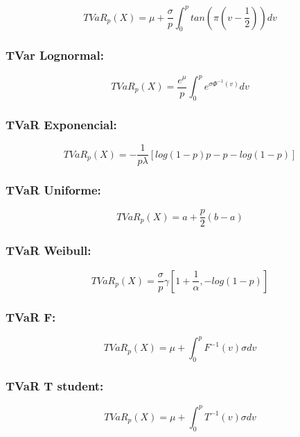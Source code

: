 \documentclass[]{article}
\begin{document}
\[TVaR_p(X)=\mu+\frac{\sigma}{p}\int_{0}^{p}tan\left(\pi\left(v-\frac{1}{2}\right)\right)dv\]

\hypertarget{tvar-lognormal}{%
\subsubsection{\texorpdfstring{\textbf{TVar
Lognormal:}}{TVar Lognormal:}}\label{tvar-lognormal}}

\[TVaR_p(X)=\frac{e^{\mu}}{p}\int_{0}^{p}e^{\sigma\Phi^{-1}(v)}dv\]

\hypertarget{tvar-exponencial}{%
\subsubsection{\texorpdfstring{\textbf{TVaR
Exponencial:}}{TVaR Exponencial:}}\label{tvar-exponencial}}

\[TVaR_p(X) = -\frac{1}{p\lambda}\left[log(1-p)p-p-log(1-p)\right]\]

\hypertarget{tvar-uniforme}{%
\subsubsection{\texorpdfstring{\textbf{TVaR
Uniforme:}}{TVaR Uniforme:}}\label{tvar-uniforme}}

\[TVaR_p(X) = a+\frac{p}{2}(b-a)\]

\hypertarget{tvar-weibull}{%
\subsubsection{\texorpdfstring{\textbf{TVaR
Weibull:}}{TVaR Weibull:}}\label{tvar-weibull}}

\[TVaR_p(X) = \frac{\sigma}{p}\gamma[1+\frac{1}{\alpha}, -log(1-p)]\]

\hypertarget{tvar-f}{%
\subsubsection{\texorpdfstring{\textbf{TVaR
F:}}{TVaR F:}}\label{tvar-f}}

\[TVaR_p(X) = \mu + \int_{0}^{p}F^{-1}(v)\sigma dv\]

\hypertarget{tvar-t-student}{%
\subsubsection{\texorpdfstring{\textbf{TVaR T
student:}}{TVaR T student:}}\label{tvar-t-student}}

\[TVaR_p(X) = \mu + \int_{0}^{p}T^{-1}(v)\sigma dv\]
\end{document}
